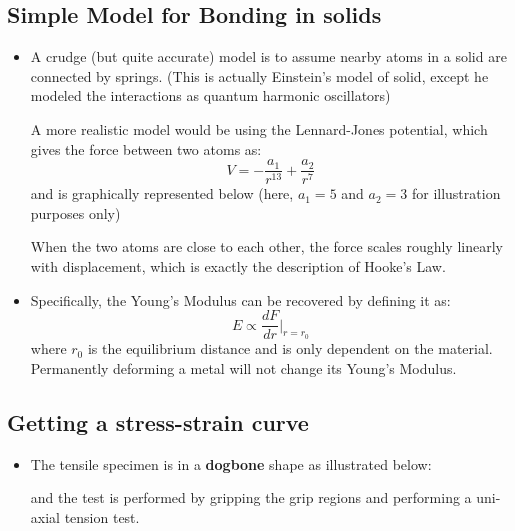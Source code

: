 \subsection{Simple Model for Bonding in solids}
\begin{itemize}
    \item A crudge (but quite accurate) model is to assume nearby atoms in a solid are connected by springs. (This is actually Einstein's model of solid, except he modeled the interactions as quantum harmonic oscillators)
    \begin{idea}
        A more realistic model would be using the Lennard-Jones potential, which gives the force between two atoms as:
        \begin{equation}
            V = -\frac{a_1}{r^{13}}+\frac{a_2}{r^7}
        \end{equation}
        and is graphically represented below (here, $a_1=5$ and $a_2=3$ for illustration purposes only)
        \begin{center}
        \end{center}
    \end{idea}
    When the two atoms are close to each other, the force scales roughly linearly with displacement, which is exactly the description of Hooke's Law.
    \item Specifically, the Young's Modulus can be recovered by defining it as:
    \begin{equation}
        E \propto \frac{dF}{dr} \Big|_{r=r_0}
    \end{equation}
    where $r_0$ is the equilibrium distance and is only dependent on the material. Permanently deforming a metal will not change its Young's Modulus.
\end{itemize}
\subsection{Getting a stress-strain curve}
\begin{itemize}
    \item The tensile specimen is in a \textbf{dogbone} shape as illustrated below:
    \begin{figure}[ht]
        \centering
    \end{figure}
    and the test is performed by gripping the grip regions and performing a uni-axial tension test.
\end{itemize}
